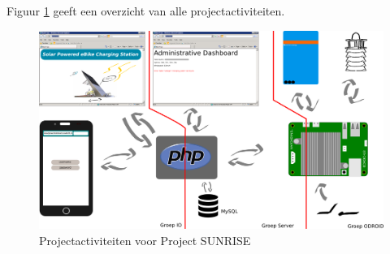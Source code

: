 \noindent
Figuur \ref{fig:overview} geeft een overzicht van alle projectactiviteiten.

\begin{figure}[htbp]
\centering
\includegraphics[width=1.1\textwidth]{project_overview.png}
\caption{Projectactiviteiten voor Project SUNRISE}\label{fig:overview}
\end{figure}